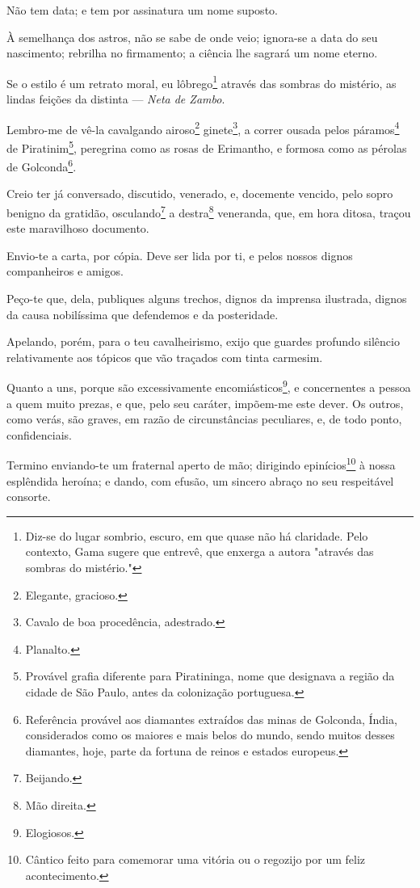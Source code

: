 Não tem data; e tem por assinatura um nome suposto.

À semelhança dos astros, não se sabe de onde veio; ignora-se a data do
seu nascimento; rebrilha no firmamento; a ciência lhe sagrará um nome
eterno.

Se o estilo é um retrato moral, eu lôbrego\footnote{Diz-se do lugar
  sombrio, escuro, em que quase não há claridade. Pelo contexto, Gama
  sugere que entrevê, que enxerga a autora "através das sombras do
  mistério."} através das sombras do mistério, as lindas feições da
distinta --- \emph{Neta de Zambo}.

Lembro-me de vê-la cavalgando airoso\footnote{Elegante, gracioso.}
ginete\footnote{Cavalo de boa procedência, adestrado.}, a correr
ousada pelos páramos\footnote{Planalto.} de Piratinim\footnote{
  Provável grafia diferente para Piratininga, nome que designava a
  região da cidade de São Paulo, antes da colonização portuguesa.},
peregrina como as rosas de Erimantho, e formosa como as pérolas de
Golconda\footnote{Referência provável aos diamantes extraídos das
  minas de Golconda, Índia, considerados como os maiores e mais belos do
  mundo, sendo muitos desses diamantes, hoje, parte da fortuna de reinos
  e estados europeus.}.

Creio ter já conversado, discutido, venerado, e, docemente vencido, pelo
sopro benigno da gratidão, osculando\footnote{Beijando.} a
destra\footnote{Mão direita.} veneranda, que, em hora ditosa, traçou
este maravilhoso documento.

Envio-te a carta, por cópia. Deve ser lida por ti, e pelos nossos dignos
companheiros e amigos.

Peço-te que, dela, publiques alguns trechos, dignos da imprensa
ilustrada, dignos da causa nobilíssima que defendemos e da posteridade.

Apelando, porém, para o teu cavalheirismo, exijo que guardes profundo
silêncio relativamente aos tópicos que vão traçados com tinta carmesim.

Quanto a uns, porque são excessivamente encomiásticos\footnote{
  Elogiosos.}, e concernentes a pessoa a quem muito prezas, e que, pelo
seu caráter, impõem-me este dever. Os outros, como verás, são graves, em
razão de circunstâncias peculiares, e, de todo ponto, confidenciais.

Termino enviando-te um fraternal aperto de mão; dirigindo
epinícios\footnote{Cântico feito para comemorar uma vitória ou o
  regozijo por um feliz acontecimento.} à nossa esplêndida heroína; e
dando, com efusão, um sincero abraço no seu respeitável consorte.

